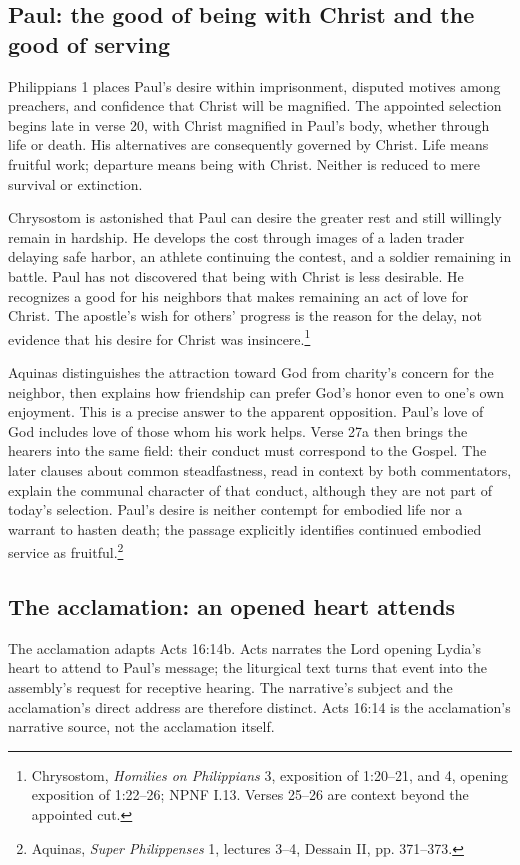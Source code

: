 \subsection{Paul: the good of being with Christ and the good of serving}
Philippians 1 places Paul's desire within imprisonment, disputed motives among preachers, and confidence that Christ will be magnified. The appointed selection begins late in verse 20, with Christ magnified in Paul's body, whether through life or death. His alternatives are consequently governed by Christ. Life means fruitful work; departure means being with Christ. Neither is reduced to mere survival or extinction.

Chrysostom is astonished that Paul can desire the greater rest and still willingly remain in hardship. He develops the cost through images of a laden trader delaying safe harbor, an athlete continuing the contest, and a soldier remaining in battle. Paul has not discovered that being with Christ is less desirable. He recognizes a good for his neighbors that makes remaining an act of love for Christ. The apostle's wish for others' progress is the reason for the delay, not evidence that his desire for Christ was insincere.\footnote{Chrysostom, \textit{Homilies on Philippians} 3, exposition of 1:20--21, and 4, opening exposition of 1:22--26; NPNF I.13. Verses 25--26 are context beyond the appointed cut.}

Aquinas distinguishes the attraction toward God from charity's concern for the neighbor, then explains how friendship can prefer God's honor even to one's own enjoyment. This is a precise answer to the apparent opposition. Paul's love of God includes love of those whom his work helps. Verse 27a then brings the hearers into the same field: their conduct must correspond to the Gospel. The later clauses about common steadfastness, read in context by both commentators, explain the communal character of that conduct, although they are not part of today's selection. Paul's desire is neither contempt for embodied life nor a warrant to hasten death; the passage explicitly identifies continued embodied service as fruitful.\footnote{Aquinas, \textit{Super Philippenses} 1, lectures 3--4, Dessain II, pp. 371--373.}

\subsection{The acclamation: an opened heart attends}
The acclamation adapts Acts 16:14b. Acts narrates the Lord opening Lydia's heart to attend to Paul's message; the liturgical text turns that event into the assembly's request for receptive hearing. The narrative's subject and the acclamation's direct address are therefore distinct. Acts 16:14 is the acclamation's narrative source, not the acclamation itself.

